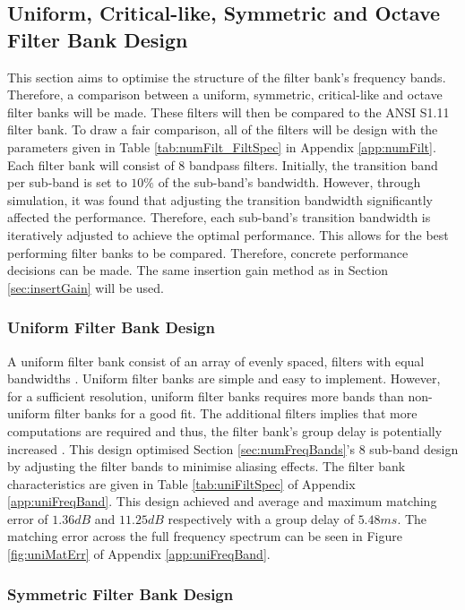 \documentclass[11pt,onecolumn]{witseiepaper}
\begin{document}
\subsection{Uniform, Critical-like, Symmetric and Octave Filter Bank Design}
\label{sec:uniCritSymOct}

\noindent This section aims to optimise the structure of the filter bank's frequency bands. Therefore, a comparison between a uniform, symmetric, critical-like and octave filter banks will be made. These filters will then be compared to the ANSI S1.11 filter bank. To draw a fair comparison, all of the filters will be design with the parameters given in Table \ref{tab:numFilt_FiltSpec} in Appendix \ref{app:numFilt}. Each filter bank will consist of $8$ bandpass filters. Initially, the transition band per sub-band is set to $10\%$ of the sub-band's bandwidth. However, through simulation, it was found that adjusting the transition bandwidth significantly affected the performance. Therefore, each sub-band's transition bandwidth is iteratively adjusted to achieve the optimal performance. This allows for the best performing filter banks to be compared. Therefore, concrete performance decisions can be made. The same insertion gain method as in Section \ref{sec:insertGain} will be used.

\subsubsection{Uniform Filter Bank Design}
\label{sec:uniDesign}

\noindent A uniform filter bank consist of an array of evenly spaced, filters with equal bandwidths \cite{chang}. Uniform filter banks are simple and easy to implement. However, for a sufficient resolution, uniform filter banks requires more bands than non-uniform filter banks for a good fit. The additional filters implies that more computations are required and thus, the filter bank's group delay is potentially increased \cite{brennan}. This design optimised Section \ref{sec:numFreqBands}'s $8$ sub-band design by adjusting the filter bands to minimise aliasing effects. The filter bank characteristics are given in Table \ref{tab:uniFiltSpec} of Appendix \ref{app:uniFreqBand}. This design achieved and average and maximum matching error of $1.36dB$ and $11.25dB$ respectively with a group delay of $5.48ms$. The matching error across the full frequency spectrum can be seen in Figure \ref{fig:uniMatErr} of Appendix \ref{app:uniFreqBand}.

\subsubsection{Symmetric Filter Bank Design}
\label{sec:symmDesign}
\end{document}
